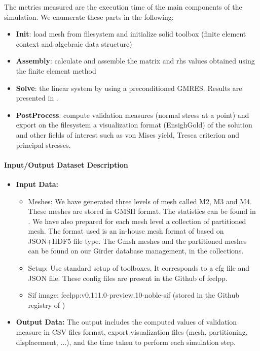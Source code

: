 The metrics measured are the execution time of the main components of the simulation. We enumerate these parts in the following:
\begin{itemize}
\item \textbf{Init}: load mesh from filesystem and initialize solid toolbox (finite element context and algebraic data structure)
\item \textbf{Assembly}: calculate and assemble the matrix and rhs values obtained using the finite element method
\item \textbf{Solve}: the linear system by using a preconditioned GMRES. Results
  are presented in .
\item \textbf{PostProcess}: compute validation measures (normal stress at a point)
  and export on the filesystem a visualization format (EnsighGold) of the
  solution and other fields of interest such as von Mises yield, Tresca criterion and
  principal stresses.
\end{itemize}

\paragraph{Input/Output Dataset Description}

\begin{itemize}
\item \textbf{Input Data:}
  \begin{itemize}
  \item Meshes: We have generated three levels of mesh called M2, M3
    and M4. These meshes are stored in GMSH format. The statistics can be found in
    . We have also prepared for
    each mesh level a collection of partitioned mesh.
    The format used is an in-house mesh format of \Feelpp based on
    JSON+HDF5 file type.
    The Gmsh meshes and the partitioned meshes can be found on our Girder
    database management, in the \Feelpp collections.
  \item Setup: Use standard setup of \Feelpp toolboxes. It corresponds to a cfg
    file and JSON file. These config files are present in the Github of feelpp.
  \item Sif image: feelpp:v0.111.0-preview.10-noble-sif  (stored in the Github registry of \Feelpp)
  \end{itemize}
\item \textbf{Output Data:} The output includes the computed values of
  validation measure in CSV files format, export visualization files (mesh,
  partitioning, displacement, ...), and the time taken to perform each simulation step.
\end{itemize}

